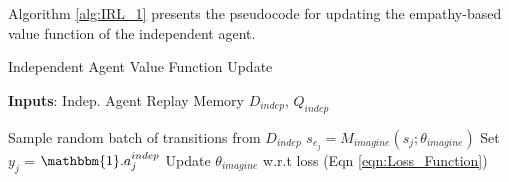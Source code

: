 Algorithm \ref{alg:IRL_1} presents the pseudocode for updating the empathy-based value function of the independent agent. 

\begin{algorithm}[h]
    \caption{Independent Agent Value Function Update}
	\label{alg:IRL_1}
	\begin{flushleft}
    \textbf{Inputs}: Indep. Agent Replay Memory $D_{indep}$, $\hat{Q}_{indep}$\\
	\end{flushleft}
	\begin{algorithmic}[1] %
	    \STATE Sample random batch of transitions from $D_{indep}$
		\STATE $s_{e_{j}} = M_{imagine}(s_{j} ; \theta_{imagine})$
		\STATE Set $y_{j}$ = $\mathbbm{1}.a_{j}^{indep}$
		\STATE Update $\theta_{imagine}$ w.r.t loss (Eqn \ref{eqn:Loss_Function})
		\ENDFOR
	\end{algorithmic}
\end{algorithm}

\iffalse
\STATE $\pi(a_{j}|s_{j})=\frac{e^{\hat{Q_{indep}(s_{j},a_{j};\theta_{indep})}}}{\sum_{a}e^{\hat{Q_{indep}(s_{j},a;\theta_{indep})}}}$ 
\STATE
$\theta_{indep} = [\theta_{imagine},\theta_{selfish}]$
\STATE $\frac{1}{n}\sum\left((1-\delta)\text{CE}(y_{j},\pi(a_{j}|s_{j})) + \delta\norm{s_{j} - s^{i}_{j}}\right)$
\fi

